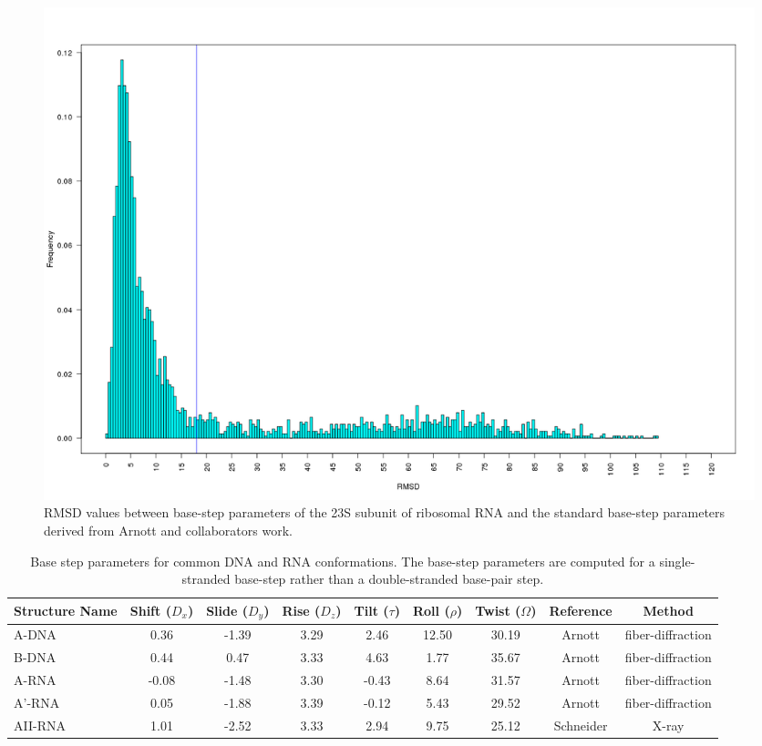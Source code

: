 \begin{figure}
 \centering
\includegraphics[angle=0, scale=0.3]{Chapter2/dormsd.png}
\caption{RMSD values between base-step parameters of the 23S subunit of
  ribosomal RNA and the standard base-step parameters derived from
  Arnott and collaborators \cite{arnott1973} work.}
 \label{fig:dormsd}
\end{figure}

\begin{table}
\begin{center}
{\small
\begin{tabular}{p{1.8cm}|c|c|c|c|c|c|c|c}
\hline
\textbf{Structure Name} & Shift ($D_x$) & Slide ($D_y$) & Rise ($D_z$) & Tilt
($\tau$) & Roll ($\rho$) & Twist ($\Omega$) & \textbf{Reference} &
\textbf{Method} \\ \hline
A-DNA & 0.36 & -1.39 & 3.29 & 2.46 & 12.50 & 30.19 & Arnott
\cite{arnott1999} & fiber-diffraction \\ \hline
B-DNA & 0.44 & 0.47 & 3.33 & 4.63 & 1.77 & 35.67   & Arnott
\cite{arnott1999} & fiber-diffraction \\ \hline
A-RNA & -0.08 & -1.48 & 3.30 & -0.43 & 8.64 & 31.57 & Arnott
\cite{arnott1999} & fiber-diffraction \\ \hline
A'-RNA & 0.05 & -1.88 & 3.39 & -0.12 & 5.43 & 29.52 & Arnott
\cite{arnott1999} & fiber-diffraction \\ \hline
AII-RNA & 1.01 & -2.52 & 3.33 & 2.94 & 9.75 & 25.12 & Schneider
\cite{schneider2004} & X-ray \\ \hline
\end{tabular}
}
\caption{Base step parameters for common DNA and RNA
  conformations. The base-step parameters are computed for
  a single-stranded base-step rather than a double-stranded base-pair step.}
\end{center}
\label{tab:conformations}
\end{table}

